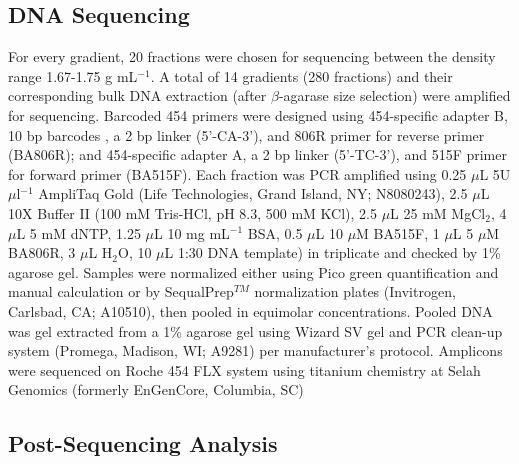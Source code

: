 \documentclass{article}
\begin{document}
\subsection{DNA Sequencing}  For every gradient, 20 fractions were chosen for
sequencing between the density range 1.67-1.75 g mL$^{-1}$.
A total of 14 gradients (280 fractions) and their corresponding bulk DNA
extraction (after $\beta$-agarase size selection) were amplified for
sequencing. Barcoded 454 primers were designed using 454-specific adapter B, 10
bp barcodes \citep{Hamady_2008}, a 2 bp linker (5'-CA-3'), and 806R primer for
reverse primer (BA806R); and 454-specific adapter A, a 2 bp linker (5'-TC-3'),
and 515F primer for forward primer (BA515F). Each fraction was PCR amplified
using 0.25 $\mu$L 5U $\mu$l$^{-1}$ AmpliTaq Gold (Life
Technologies, Grand Island, NY; N8080243), 2.5 $\mu$L 10X Buffer II (100 mM
Tris-HCl, pH 8.3, 500 mM KCl), 2.5 $\mu$L 25 mM MgCl$_{2}$, 4 $\mu$L 5 mM dNTP,
1.25 $\mu$L 10 mg mL$^{-1}$ BSA, 0.5 $\mu$L 10 $\mu$M BA515F,
1 $\mu$L 5 $\mu$M BA806R, 3 $\mu$L H$_{2}$O, 10 $\mu$L 1:30 DNA template) in
triplicate and checked by 1\% agarose gel. Samples were normalized either using
Pico green quantification and manual calculation or by
SequalPrep$^{TM}$ normalization plates (Invitrogen, Carlsbad, CA;
A10510), then pooled in equimolar concentrations. Pooled DNA was gel extracted
from a 1\% agarose gel using Wizard SV gel and PCR clean-up system (Promega,
Madison, WI; A9281) per manufacturer's protocol.  Amplicons were sequenced on
Roche 454 FLX system using titanium chemistry at Selah Genomics (formerly
EnGenCore, Columbia, SC)    

\subsection{Post-Sequencing Analysis}
\end{document}
